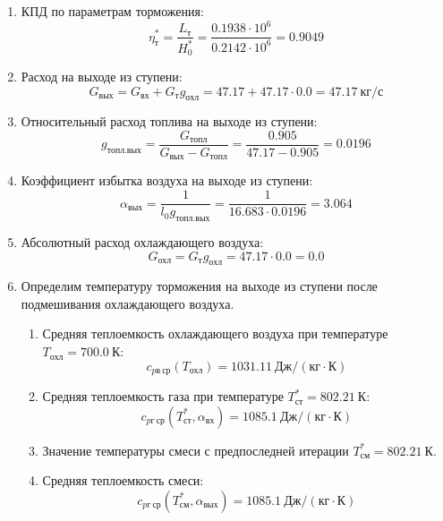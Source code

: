 \documentclass[a4paper,12pt]{article}
\begin{document}
\begin{enumerate}
        \item КПД по параметрам торможения:
        \[
            \eta_т^* = \frac{ L_т }{ H_0^* } =
                \frac{
                    0.1938 \cdot 10^6
                }{
                    0.2142 \cdot 10^6 } =
            0.9049
        \]

        \item Расход на выходе из ступени:
        \[
            G_{вых} = G_{вх} + G_т g_{охл} =
                47.17 + 47.17 \cdot
                0.0 =
            47.17 \ кг/с
        \]

        \item Относительный расход топлива на выходе из ступени:
        \[
            g_{топл.вых} = \frac{ G_{топл} }{ G_{вых} - G_{топл} } =
                 \frac{ 0.905 }{ 47.17 - 0.905 } =
            0.0196
        \]

        \item Коэффициент избытка воздуха на выходе из ступени:
        \[
            \alpha_{вых} = \frac{ 1 }{ l_0 g_{топл.вых} } =
                \frac{ 1 }{ 16.683 \cdot 0.0196 } =
            3.064
        \]

        \item Абсолютный расход охлаждающего воздуха:
        \[
            G_{охл} = G_т g_{охл} = 47.17 \cdot 0.0 =
            0.0
        \]

        \item Определим температуру торможения на выходе из ступени после подмешивания охлаждающего воздуха.
        \begin{enumerate}

            \item Средняя теплоемкость охлаждающего воздуха при температуре $T_{охл} = 700.0\ К $:
            \[
                c_{pв\ ср} (T_{охл}) = 1031.11\ Дж/ (кг \cdot К)
            \]

            \item Средняя теплоемкость газа при температуре $T_{ст}^* = 802.21 \ К $:
            \[
                c_{pг\ ср} (T_{ст}^*, \alpha_{вх}) =
                1085.1\ Дж/ (кг \cdot К)
            \]

            \item Значение температуры смеси с предпоследней итерации $T_{см}^{*} = 802.21\ К$.

            \item Средняя теплоемкость смеси:
            \[
                c_{pг\ ср} (T_{см}^{*}, \alpha_{вых}) =
                1085.1\ Дж/ (кг \cdot К)
            \]


\end{enumerate}
\end{enumerate}
\end{document}

